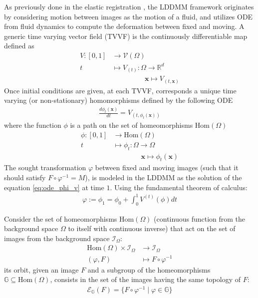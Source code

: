 As previously done in the elastic registration \cite{Broit:1981}, the LDDMM framework \cite{beg2005computing} originates by considering motion between images as the motion of a fluid, and utilizes ODE from fluid dynamics to compute the deformation between fixed and moving. 
 A generic time varying vector field (TVVF) is the continuously differentiable map defined as
 \begin{align*}
 	V:[0,1] & \longrightarrow  \mathcal{V}(\Omega)\\
 	t  &\longmapsto  V_{(t)}  : \Omega \longrightarrow   \mathbb{R}^{d} \\
 	& \qquad \quad \quad ~~~\mathbf{x} \longmapsto V_{(t,\mathbf{x} )}
 \end{align*}
 Once initial conditions are given, at each TVVF, corresponds a unique time varying (or non-stationary) homomorphisms defined  by the following ODE 
 \begin{align}\label{eq:ode_phi_v}
 	\frac{d\phi_{t} (\mathbf{x})}{dt} = V_{(t,\phi_{t} (\mathbf{x}) )}
 \end{align}
 where the function $\phi$ is a path on the set of homeomorphisms $\text{Hom}(\Omega)$
 \begin{align*}
 	\phi : [0,1] & \longrightarrow  \text{Hom}(\Omega)\\
 	t  &\longmapsto \phi_{t}  : \Omega \longrightarrow    \Omega \\
 	& \qquad \quad \quad  \mathbf{x} \longmapsto \phi_{t}  (\mathbf{x} )
 \end{align*}
 The sought transformation $\varphi$ between fixed and moving images (such that it should satisfy $ F\circ \varphi^{-1} = M $), is modeled in the LDDMM as the solution of the equation \ref{eq:ode_phi_v} at time $1$. Using the fundamental theorem of calculus:
 \begin{align*}
 	\varphi := \phi_{1} = \phi_{0} + \int_0^1 V^{(t)} (\phi) dt
 \end{align*}
 
 
 
 
Consider the set of homeomorphisms $\text{Hom}(\Omega)$ (continuous function from the background space $\Omega$ to itself with continuous inverse) that act
on the set of images from the background space $\mathcal{I}_{\Omega}$:
\begin{align*}
	\text{Hom}(\Omega) \times \mathcal{I}_{\Omega} & \longrightarrow  \mathcal{I}_{\Omega}   \\
	(\varphi,F) &\longmapsto F\circ \varphi^{-1}
\end{align*}
its orbit, given an image $F$ and a subgroup of the homeomorphisms $\mathbb{G}\subseteq \text{Hom}(\Omega)$, consists in the set of the images having the same topology of $F$: 
\begin{align*}
	\mathcal{E}_{\mathbb{G}}(F) = \{ F\circ \varphi^{-1} \mid \varphi \in \mathbb{G} \}
\end{align*}



